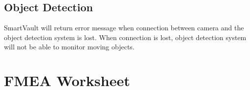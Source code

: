 \documentclass{article}
\begin{document}
\subsection{Object Detection}
SmartVault will return error message when connection between camera and the object detection system is lost. When connection is lost, object detection system will not be able to monitor moving objects.


\section{FMEA Worksheet}

\begin{center}
\begin{table}[h]
\end{table}
\end{center}
\end{document}
